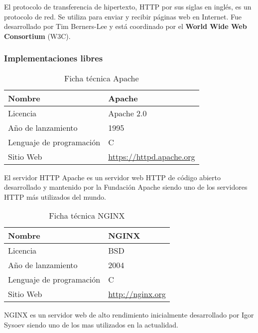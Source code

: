 El protocolo de transferencia de hipertexto, HTTP por sus siglas en inglés, es un protocolo de red. Se utiliza para enviar y recibir páginas web en Internet. Fue desarrollado por Tim Berners-Lee y está coordinado por el \textbf{World Wide Web Consortium} (W3C).

\subsubsection {Implementaciones libres}

\begin{table}[H]
\begin{tabular}{|l|l|}
\hline
Nombre                   & Apache                       \\ \hline
Licencia                 & Apache 2.0                        \\ \hline
Año de lanzamiento       & 1995                         \\ \hline
Lenguaje de programación & C                            \\ \hline
Sitio Web                & \url{https://httpd.apache.org} \\ \hline
\end{tabular}
\caption{Ficha técnica Apache}
\end{table}

El servidor HTTP Apache es un servidor web HTTP de código abierto desarrollado y mantenido por la Fundación Apache siendo uno de los servidores HTTP más utilizados del mundo.​


\begin{table}[H]
\begin{tabular}{|l|l|}
\hline
Nombre                   & NGINX                       \\ \hline
Licencia                 & BSD                        \\ \hline
Año de lanzamiento       & 2004                        \\ \hline
Lenguaje de programación & C                            \\ \hline
Sitio Web                & \url{http://nginx.org} \\ \hline
\end{tabular}
\caption{Ficha técnica NGINX}
\end{table}

NGINX es un servidor web de alto rendimiento inicialmente desarrollado por Igor Sysoev siendo uno de los mas utilizados en la actualidad.

